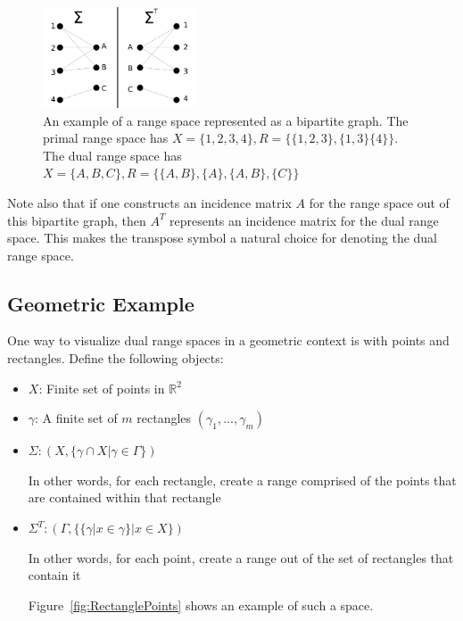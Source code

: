 \documentclass[11pt]{article}
\begin{document}
\begin{figure}[h]
\centering
\includegraphics[width=0.4\textwidth]{BipartiteGraph.png}
\caption{An example of a range space represented as a bipartite graph.  The primal range space has $X = \{ 1, 2, 3, 4 \} , R = \{ \{1, 2, 3\}, \{1, 3\} \{ 4 \} \}$.  The dual range space has $X = \{A, B, C\}, R = \{ \{ A, B \}, \{ A \}, \{ A, B \}, \{ C \} \}$}
\label{fig:BipartiteGraph}
\end{figure}

Note also that if one constructs an incidence matrix $A$ for the range space out of this bipartite graph, then $A^T$ represents an incidence matrix for the dual range space.  This makes the transpose symbol a natural choice for denoting the dual range space.

\subsection{Geometric Example}
\label{sec:GeometricExample}

One way to visualize dual range spaces in a geometric context is with points and rectangles.  Define the following objects:

\begin{itemize}

\item $X$: Finite set of points in $\mathbb{R}^2$

\item $\gamma$: A finite set of $m$ rectangles $(\gamma_1, ..., \gamma_m)$

\item $\Sigma: (X, \{ \gamma \cap X | \gamma \in \Gamma \} ) $

In other words, for each rectangle, create a range comprised of the points that are contained within that rectangle

\item $\Sigma^T: ( \Gamma, \{ \{ \gamma | x \in \gamma\} | x \in X \} )$

In other words, for each point, create a range out of the set of rectangles that contain it

Figure~\ref{fig:RectanglePoints} shows an example of such a space.

\end{itemize}
\end{document}
